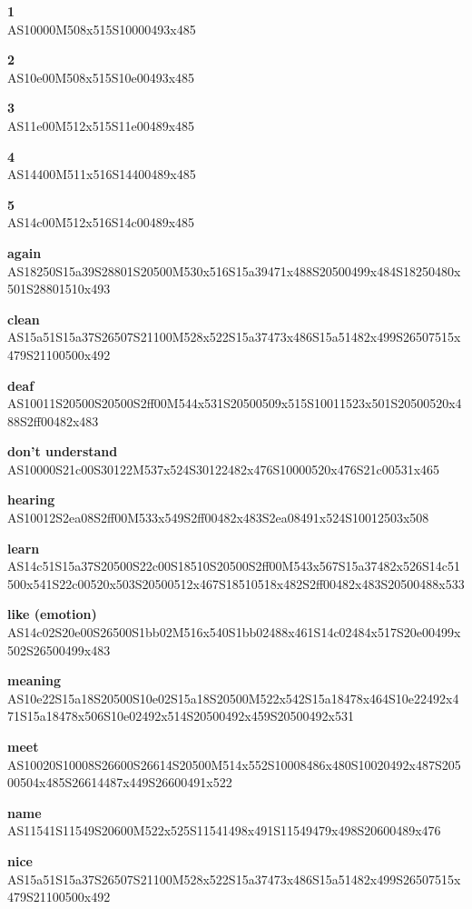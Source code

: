 \documentclass{article}
\begin{document}
\begin{glossary}
\textbf{1}\\
AS10000M508x515S10000493x485

\textbf{2}\\
AS10e00M508x515S10e00493x485

\textbf{3}\\
AS11e00M512x515S11e00489x485

\textbf{4}\\
AS14400M511x516S14400489x485

\textbf{5}\\
AS14c00M512x516S14c00489x485

\textbf{again}\\
AS18250S15a39S28801S20500M530x516S15a39471x488S20500499x484S18250480x501S28801510x493

\textbf{clean}\\
AS15a51S15a37S26507S21100M528x522S15a37473x486S15a51482x499S26507515x479S21100500x492

\textbf{deaf}\\
AS10011S20500S20500S2ff00M544x531S20500509x515S10011523x501S20500520x488S2ff00482x483

\textbf{don't understand}\\
AS10000S21c00S30122M537x524S30122482x476S10000520x476S21c00531x465

\textbf{hearing}\\
AS10012S2ea08S2ff00M533x549S2ff00482x483S2ea08491x524S10012503x508

\textbf{learn}\\
AS14c51S15a37S20500S22c00S18510S20500S2ff00M543x567S15a37482x526S14c51500x541S22c00520x503S20500512x467S18510518x482S2ff00482x483S20500488x533

\textbf{like (emotion)}\\
AS14c02S20e00S26500S1bb02M516x540S1bb02488x461S14c02484x517S20e00499x502S26500499x483

\textbf{meaning}\\
AS10e22S15a18S20500S10e02S15a18S20500M522x542S15a18478x464S10e22492x471S15a18478x506S10e02492x514S20500492x459S20500492x531

\textbf{meet}\\
AS10020S10008S26600S26614S20500M514x552S10008486x480S10020492x487S20500504x485S26614487x449S26600491x522

\textbf{name}\\
AS11541S11549S20600M522x525S11541498x491S11549479x498S20600489x476

\textbf{nice}\\
AS15a51S15a37S26507S21100M528x522S15a37473x486S15a51482x499S26507515x479S21100500x492


\end{glossary}
\end{document}
